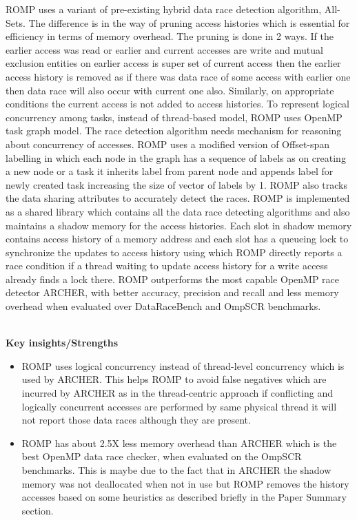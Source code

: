 \documentclass[20pt]{letter}
\begin{document}
\begin{enumerate}
{ROMP uses a variant of pre-existing hybrid data race detection algorithm, All-Sets. The difference is in the way of pruning access histories which is essential for efficiency in terms of memory overhead. The pruning is done in 2 ways. If the earlier access was read or earlier and current accesses are write and mutual exclusion entities on earlier access is super set of current access then the earlier access history is removed as if there was data race of some access with earlier one then data race will also occur with current one also. Similarly, on appropriate conditions the current access is not added to access histories. To represent logical concurrency among tasks, instead of thread-based model, ROMP uses OpenMP task graph model. The race detection algorithm needs mechanism for reasoning about concurrency of accesses. ROMP uses a modified version of Offset-span labelling in which each node in the graph has a sequence of labels as on creating a new node or a task it inherits label from parent node and appends label for newly created task increasing the size of vector of labels by 1. ROMP also tracks the data sharing attributes to accurately detect the races. ROMP is implemented as a shared library which contains all the data race detecting algorithms and also maintains a shadow memory for the access histories. Each slot in shadow memory contains access history of a memory address and each slot has a queueing lock to synchronize the updates to access history using which ROMP directly reports a race condition if a thread waiting to update access history for a write access already finds a lock there. ROMP outperforms the most capable OpenMP race detector ARCHER, with better accuracy, precision and recall and less memory overhead when evaluated over DataRaceBench and OmpSCR benchmarks.

\textbf{\\Key insights/Strengths}\\
\begin{itemize}
    \item ROMP uses logical concurrency instead of thread-level concurrency which is used by ARCHER. This helps ROMP to avoid false negatives which are incurred by ARCHER as in the thread-centric approach if conflicting and logically concurrent accesses are performed by same physical thread it will not report those data races although they are present.\\

    \item ROMP has about 2.5X less memory overhead than ARCHER which is the best OpenMP data race checker, when evaluated on the OmpSCR benchmarks. This is maybe due to the fact that in ARCHER the shadow memory was not deallocated when not in use but ROMP removes the history accesses based on some heuristics as described briefly in the Paper Summary section.\\


\end{itemize}}
\end{enumerate}
\end{document}
